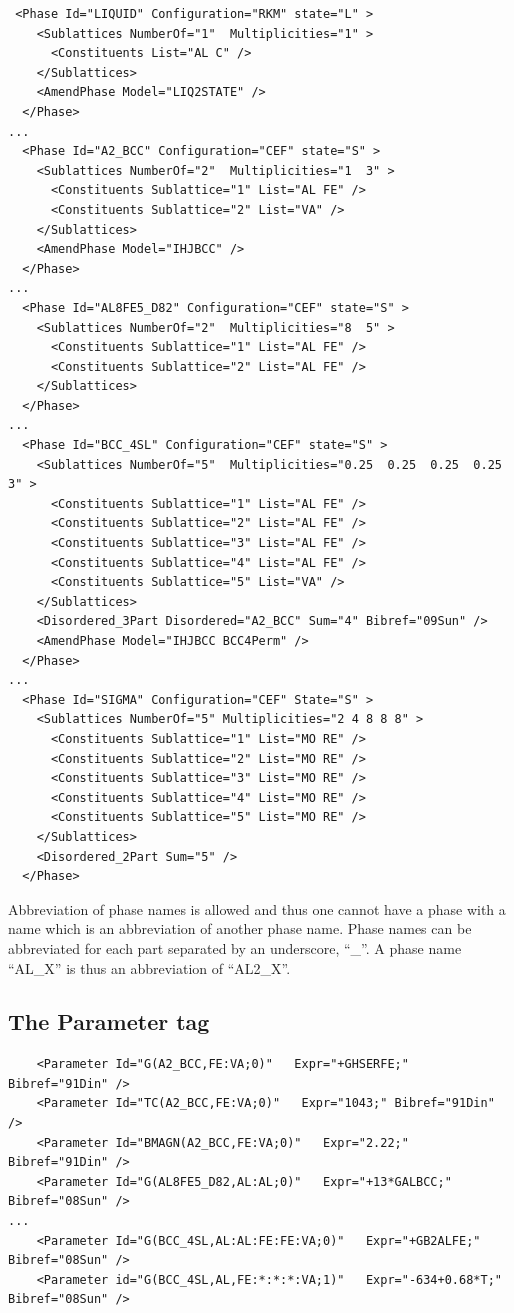 \documentclass{article}
\begin{document}
\begin{appendices}
{\small
\begin{verbatim}
 <Phase Id="LIQUID" Configuration="RKM" state="L" >
    <Sublattices NumberOf="1"  Multiplicities="1" >
      <Constituents List="AL C" />
    </Sublattices>
    <AmendPhase Model="LIQ2STATE" />
  </Phase>
...
  <Phase Id="A2_BCC" Configuration="CEF" state="S" >
    <Sublattices NumberOf="2"  Multiplicities="1  3" >
      <Constituents Sublattice="1" List="AL FE" />
      <Constituents Sublattice="2" List="VA" />
    </Sublattices>
    <AmendPhase Model="IHJBCC" />
  </Phase>
...
  <Phase Id="AL8FE5_D82" Configuration="CEF" state="S" >
    <Sublattices NumberOf="2"  Multiplicities="8  5" >
      <Constituents Sublattice="1" List="AL FE" />
      <Constituents Sublattice="2" List="AL FE" />
    </Sublattices>
  </Phase>
...
  <Phase Id="BCC_4SL" Configuration="CEF" state="S" >
    <Sublattices NumberOf="5"  Multiplicities="0.25  0.25  0.25  0.25  3" >
      <Constituents Sublattice="1" List="AL FE" />
      <Constituents Sublattice="2" List="AL FE" />
      <Constituents Sublattice="3" List="AL FE" />
      <Constituents Sublattice="4" List="AL FE" />
      <Constituents Sublattice="5" List="VA" />
    </Sublattices>
    <Disordered_3Part Disordered="A2_BCC" Sum="4" Bibref="09Sun" />
    <AmendPhase Model="IHJBCC BCC4Perm" />
  </Phase>
...
  <Phase Id="SIGMA" Configuration="CEF" State="S" >
    <Sublattices NumberOf="5" Multiplicities="2 4 8 8 8" >
      <Constituents Sublattice="1" List="MO RE" />
      <Constituents Sublattice="2" List="MO RE" />
      <Constituents Sublattice="3" List="MO RE" />
      <Constituents Sublattice="4" List="MO RE" />
      <Constituents Sublattice="5" List="MO RE" />
    </Sublattices>
    <Disordered_2Part Sum="5" />
  </Phase>
\end{verbatim}
}

Abbreviation of phase names is allowed and thus one cannot have a phase
with a name which is an abbreviation of another phase name.  Phase
names can be abbreviated for each part separated by an underscore,
``\_''.  A phase name ``AL\_X'' is thus an abbreviation of ``AL2\_X''.

\subsection{The Parameter tag}\label{sec:parameter examples}

{\small
\begin{verbatim}
    <Parameter Id="G(A2_BCC,FE:VA;0)"   Expr="+GHSERFE;" Bibref="91Din" />
    <Parameter Id="TC(A2_BCC,FE:VA;0)"   Expr="1043;" Bibref="91Din" />
    <Parameter Id="BMAGN(A2_BCC,FE:VA;0)"   Expr="2.22;" Bibref="91Din" />
    <Parameter Id="G(AL8FE5_D82,AL:AL;0)"   Expr="+13*GALBCC;" Bibref="08Sun" />
...
    <Parameter Id="G(BCC_4SL,AL:AL:FE:FE:VA;0)"   Expr="+GB2ALFE;" Bibref="08Sun" />
    <Parameter id="G(BCC_4SL,AL,FE:*:*:*:VA;1)"   Expr="-634+0.68*T;" Bibref="08Sun" />
\end{verbatim}
}


\end{appendices}
\end{document}
